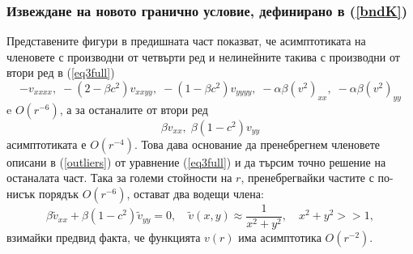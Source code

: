\documentclass{article}
\newcommand{\be}{\begin{equation}}
\newcommand{\ee}{\end{equation}}
\newcommand{\rf}[1]{(\ref{#1})}
\theoremstyle{remark}
\begin{document}
\subsubsection{Извеждане на новото гранично условие, дефинирано в \rf{bndK} }
Представените фигури в предишната част показват, че асимптотиката на членовете с производни от четвърти ред и нелинейните такива с производни от втори ред в \rf{eq3full}
\be\label{outliers}
- v_{xxxx}, \;  - (2-\beta c^2)v_{xxyy},  \;  - (1-\beta c^2)v_{yyyy}, \;  - \alpha \beta (v^2)_{xx}, \; - \alpha \beta (v^2)_{yy}
\ee
e $O(r^{-6})$, а за останалите от втори ред
$$
\beta v_{xx}, \; \beta (1-c^2) v_{yy}
$$
асимптотиката е $O(r^{-4})$. Това дава основание да пренебрегнем членовете описани в \rf{outliers} от уравнение \rf{eq3full} и да търсим точно решение на останалата част. Така за големи стойности на $r$, пренебрегвайки частите с по-нисък порядък $O(r^{-6})$, остават два водещи члена:
\be\label{asymptEq}
\beta \tilde v_{xx} + \beta (1-c^2) \tilde v_{yy} =0, \quad \tilde v(x,y) \approx \frac{1}{x^2 + y^2}, \quad x^2 + y^2 >>1,
\ee
взимайки предвид факта, че функцията $v(r)$ има асимптотика $O(r^{-2})$.
\end{document}
